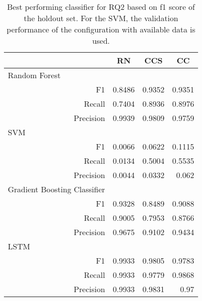 \begin{table}[]
    \centering
    \begin{tabular}{rrrr}
    \toprule
    \multicolumn{1}{l}{}                             & \multicolumn{1}{c}{RN}         & \multicolumn{1}{c}{CCS} & \multicolumn{1}{c}{CC} \\ \midrule
    \multicolumn{1}{l}{Random Forest}                &  &            &              \\
    F1                                               & 0.8486               & 0.9352     & 0.9351       \\
    Recall                                           & 0.7404               & 0.8936     & 0.8976       \\
    Precision                                        & 0.9939               & 0.9809     & 0.9759       \\ \midrule
    \multicolumn{1}{l}{SVM}                          &                      &            &              \\
    F1                                               &   0.0066             &  0.0622    &   0.1115     \\
    Recall                                           &   0.0134             &  0.5004    &   0.5535     \\
    Precision                                        &   0.0044             &  0.0332    &   0.062      \\ \midrule
    \multicolumn{1}{l}{Gradient Boosting Classifier} &                      &            &              \\
    F1                                               & 0.9328               & 0.8489     & 0.9088       \\
    Recall                                           & 0.9005               & 0.7953     & 0.8766       \\
    Precision                                        & 0.9675               & 0.9102     & 0.9434       \\ \midrule
    \multicolumn{1}{l}{LSTM}                         &                      &            &              \\
    F1                                               & 0.9933               & 0.9805     & 0.9783       \\
    Recall                                           & 0.9933               & 0.9779     & 0.9868       \\
    Precision                                        & 0.9933               & 0.9831     & 0.97       \\ \bottomrule
    \end{tabular}
    \caption{Best performing classifier for RQ2 based on f1 score of the holdout set. For the SVM, the validation performance of the configuration with available data is used.}
    \label{tab:rq2_best_classifier}
    \end{table}